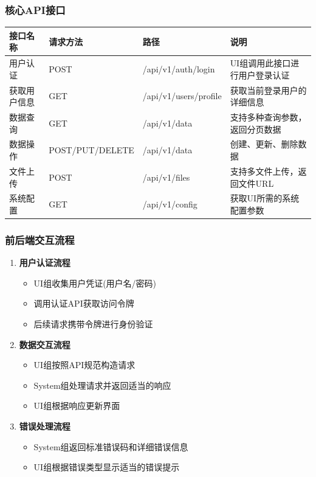 \documentclass[a4paper,12pt]{article}
\begin{document}
\subsubsection{核心API接口}

\begin{longtable}{|p{3cm}|p{2.5cm}|p{2.5cm}|p{7cm}|}
\hline
\textbf{接口名称} & \textbf{请求方法} & \textbf{路径} & \textbf{说明} \\
\hline
\endhead
用户认证 & POST & /api/v1/auth/login & UI组调用此接口进行用户登录认证 \\
\hline
获取用户信息 & GET & /api/v1/users/profile & 获取当前登录用户的详细信息 \\
\hline
数据查询 & GET & /api/v1/data & 支持多种查询参数，返回分页数据 \\
\hline
数据操作 & POST/PUT/DELETE & /api/v1/data & 创建、更新、删除数据 \\
\hline
文件上传 & POST & /api/v1/files & 支持多文件上传，返回文件URL \\
\hline
系统配置 & GET & /api/v1/config & 获取UI所需的系统配置参数 \\
\hline
\end{longtable}

\subsubsection{前后端交互流程}

\begin{enumerate}
  \item \textbf{用户认证流程}
  \begin{itemize}
    \item UI组收集用户凭证(用户名/密码)
    \item 调用认证API获取访问令牌
    \item 后续请求携带令牌进行身份验证
  \end{itemize}
  
  \item \textbf{数据交互流程}
  \begin{itemize}
    \item UI组按照API规范构造请求
    \item System组处理请求并返回适当的响应
    \item UI组根据响应更新界面
  \end{itemize}
  
  \item \textbf{错误处理流程}
  \begin{itemize}
    \item System组返回标准错误码和详细错误信息
    \item UI组根据错误类型显示适当的错误提示
  \end{itemize}
\end{enumerate}
\end{document}

